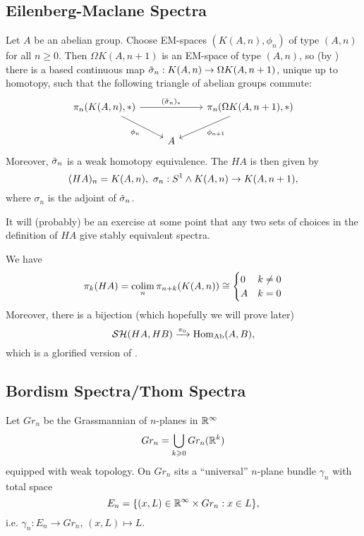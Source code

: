 
\subsection*{Eilenberg-Maclane Spectra}


Let $A$ be an abelian group. Choose EM-spaces $(K(A,n),\phi_n)$ of type $(A,n)$ for all $n\geq0$. Then $\Omega K(A,n+1)$ is an EM-space of type $(A,n)$, so (by \cite[\nopp theorem IV.10]{AT1Notes}) there is a based continuous map $\tilde\sigma_n:K(A,n)\to\Omega K(A,n+1)$, unique up to homotopy, such that the following triangle of abelian groups commute:
\[
\begin{tikzcd}
\pi_n(K(A,n),*) \ar[rr,"(\til\sigma_n)_*"] \ar[dr,"\phi_n"'] & & \pi_n(\Omega K(A,n+1),*) \ar[dl,"\phi_{n+1}"] \\
& A &
\end{tikzcd}
\]
Moreover, $\tilde\sigma_n$ is a weak homotopy equivalence. The  $HA$ is then given by
\[(HA)_n=K(A,n),\ \sigma_n:S^1\smsh K(A,n)\to K(A,n+1),\]
where $\sigma_n$ is the adjoint of $\tilde\sigma_n$.

\begin{remark}
It will (probably) be an exercise at some point that any two sets of choices in the definition of $HA$ give stably equivalent spectra.
\end{remark}

We have
\[
\pi_k(HA)=\operatorname*{colim}_n\pi_{n+k}(K(A,n))\cong\begin{cases}0 & k\neq0 \\ A & k=0 \end{cases}
\]
Moreover, there is a bijection (which hopefully we will prove later)
\[\mathcal{S}\mathcal{H}(HA,HB)\xrightarrow{\pi_0}\operatorname{Hom}_{\normalfont\textup{Ab}}(A,B),\]
which is a glorified version of \cite[theorem IV.10]{AT1Notes}.

\subsection*{Bordism Spectra/Thom Spectra}

Let $Gr_n$ be the Grassmannian of $n$-planes in ${\mathbb R}^\infty$
\[Gr_n=\bigcup_{k\geqslant0} Gr_n({\mathbb R}^k)\]
equipped with weak topology.
On $Gr_n$ sits a \enquote{universal} $n$-plane bundle $\gamma_n$ with total space
\[E_n=\{(x,L)\in{\mathbb R}^\infty\times Gr_n:x\in L\},\]
i.e. $\gamma_n:E_n\to Gr_n$, $(x,L)\mapsto L$.


